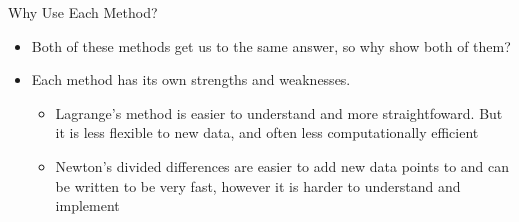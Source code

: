 {}\documentclass[letterpaper,
compress,
xcolor=x11names,
]{beamer}
\begin{document}
\begin{frame}{Why Use Each Method?}
	\footnotesize
	\begin{itemize}
		\item Both of these methods get us to the same answer, so why show both of them? 
		\item Each method has its own strengths and weaknesses.
		\begin{itemize}
			\item<2-> Lagrange's method is easier to understand and more straightfoward. But it is less flexible to new data, and often less computationally efficient
			\item<3-> Newton's divided differences are easier to add new data points to and can be written to be very fast, however it is harder to understand and implement
		\end{itemize}
	\end{itemize}
\end{frame}

\end{document}
